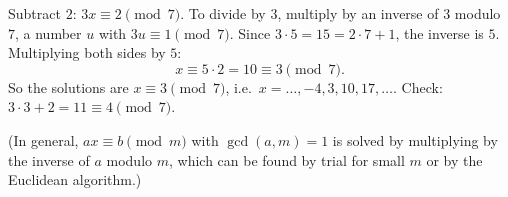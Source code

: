 Subtract $2$: $3x\equiv2\pmod7$. To divide by $3$, multiply by an inverse of $3$ modulo $7$, a number $u$ with $3u\equiv1\pmod 7$. Since $3\cdot5=15=2\cdot7+1$, the inverse is $5$. Multiplying both sides by $5$:
\[
x\equiv5\cdot2=10\equiv3\pmod7 .
\]
So the solutions are $\boxed{x\equiv3\pmod7}$, i.e.\ $x=\dots,-4,3,10,17,\dots$. Check: $3\cdot3+2=11\equiv4\pmod7$.

(In general, $ax\equiv b\pmod m$ with $\gcd(a,m)=1$ is solved by multiplying by the inverse of $a$ modulo $m$, which can be found by trial for small $m$ or by the Euclidean algorithm.)
